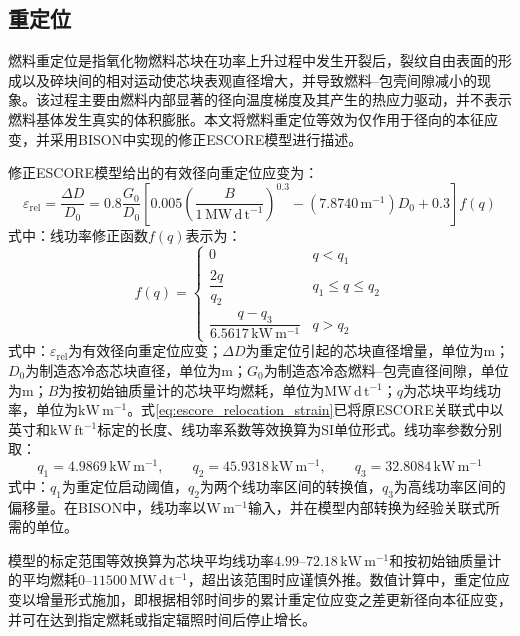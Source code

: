 \subsection{重定位}

燃料重定位是指氧化物燃料芯块在功率上升过程中发生开裂后，裂纹自由表面的形成以及碎块间的相对运动使芯块表观直径增大，并导致燃料--包壳间隙减小的现象。该过程主要由燃料内部显著的径向温度梯度及其产生的热应力驱动，并不表示燃料基体发生真实的体积膨胀。本文将燃料重定位等效为仅作用于径向的本征应变，并采用BISON中实现的修正ESCORE模型进行描述\cite{fancherESCOREEPRISteadystate1987,halesBISONTheoryManual2016}。

修正ESCORE模型给出的有效径向重定位应变为：
\begin{equation}
	\varepsilon_{\mathrm{rel}}
	=
	\frac{\Delta D}{D_0}
	=
	0.8\frac{G_0}{D_0}
	\left[
	0.005\left(\frac{B}{1\,\mathrm{MW\,d\,t^{-1}}}\right)^{0.3}
	-\left(7.8740\,\mathrm{m^{-1}}\right)D_0+0.3
	\right]f(q)
	\label{eq:escore_relocation_strain}
\end{equation}
\noindent 式中：线功率修正函数$f(q)$表示为：
\begin{equation}
	f(q)=
	\begin{cases}
		0
		& q<q_1\\[4pt]
		\dfrac{2q}{q_2}
		& q_1\leq q\leq q_2\\[8pt]
		\dfrac{q-q_3}
		{6.5617\,\mathrm{kW\,m^{-1}}}
		& q>q_2
	\end{cases}
	\label{eq:escore_relocation_power_function}
\end{equation}
\noindent 式中：$\varepsilon_{\mathrm{rel}}$为有效径向重定位应变；$\Delta D$为重定位引起的芯块直径增量，单位为$\mathrm{m}$；$D_0$为制造态冷态芯块直径，单位为$\mathrm{m}$；$G_0$为制造态冷态燃料--包壳直径间隙，单位为$\mathrm{m}$；$B$为按初始铀质量计的芯块平均燃耗，单位为$\mathrm{MW\,d\,t^{-1}}$；$q$为芯块平均线功率，单位为$\mathrm{kW\,m^{-1}}$。式\eqref{eq:escore_relocation_strain}已将原ESCORE关联式中以英寸和$\mathrm{kW\,ft^{-1}}$标定的长度、线功率系数等效换算为SI单位形式。线功率参数分别取：
\begin{equation}
	q_1=4.9869\,\mathrm{kW\,m^{-1}},\qquad
	q_2=45.9318\,\mathrm{kW\,m^{-1}},\qquad
	q_3=32.8084\,\mathrm{kW\,m^{-1}}
\end{equation}
\noindent 式中：$q_1$为重定位启动阈值，$q_2$为两个线功率区间的转换值，$q_3$为高线功率区间的偏移量。在BISON中，线功率以$\mathrm{W\,m^{-1}}$输入，并在模型内部转换为经验关联式所需的单位。

模型的标定范围等效换算为芯块平均线功率$4.99$--$72.18\,\mathrm{kW\,m^{-1}}$和按初始铀质量计的平均燃耗$0$--$11500\,\mathrm{MW\,d\,t^{-1}}$，超出该范围时应谨慎外推。数值计算中，重定位应变以增量形式施加，即根据相邻时间步的累计重定位应变之差更新径向本征应变，并可在达到指定燃耗或指定辐照时间后停止增长。

